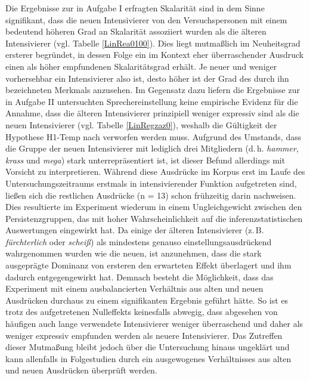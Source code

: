Die Ergebnisse zur in Aufgabe I erfragten Skalarität sind in dem Sinne signifikant, dass die neuen Intensivierer von den Versuchspersonen mit einem bedeutend höheren Grad an Skalarität assoziiert wurden als die älteren Intensivierer (vgl. Tabelle \ref{LinRea0100}). Dies liegt mutmaßlich im Neuheitsgrad ersterer begründet, in dessen Folge ein im Kontext eher überraschender Ausdruck einen als höher empfundenen Skalaritätsgrad erhält. Je neuer und weniger vorhersehbar ein Intensivierer also ist, desto höher ist der Grad des durch ihn bezeichneten Merkmals anzusehen. Im Gegensatz dazu liefern die Ergebnisse zur in {Aufgabe II} untersuchten Sprechereinstellung keine empirische Evidenz für die Annahme, dass die älteren Intensivierer prinzipiell weniger expressiv sind als die neuen Intensivierer (vgl. {Tabelle \ref{LinRegzaz0}}), weshalb die {Gültigkeit} der Hypothese H1-Temp nach {\citet[59]{Tobler.1868}} verworfen werden muss. Aufgrund des Umstands, dass die Gruppe der neuen Intensivierer mit lediglich drei Mitgliedern (d.\,h. \textit{hammer}, \textit{krass} und \textit{mega}) stark {unterrepräsentiert} ist, ist dieser Befund allerdings mit Vorsicht zu interpretieren. Während diese Ausdrücke im Korpus erst im Laufe des Untersuchungszeitraums erstmals in intensivierender Funktion aufgetreten sind, ließen sich die restlichen Ausdrücke {(n = 13)} schon frühzeitig darin nachweisen. Dies resultierte im Experiment wiederum in einem Ungleichgewicht zwischen den Persistenzgruppen, das mit hoher Wahrscheinlichkeit auf die inferenzstatistischen Auswertungen eingewirkt hat. Da einige der älteren Intensivierer (z.\,B. \textit{fürchterlich} oder \textit{scheiß}) als mindestens genauso einstellungsausdrückend wahrgenommen wurden wie die neuen, ist anzunehmen, dass die stark ausgeprägte Dominanz von ersteren den erwarteten Effekt überlagert und ihm dadurch entgegengewirkt hat. Demnach besteht die Möglichkeit, dass das Experiment mit einem ausbalancierten Verhältnis aus alten und neuen Ausdrücken durchaus zu einem signifikanten Ergebnis geführt hätte. So ist es trotz des aufgetretenen Nulleffekts keinesfalls abwegig, dass abgesehen von häufigen auch lange verwendete Intensivierer weniger überraschend und daher als weniger expressiv empfunden werden als neuere Intensivierer. Das Zutreffen dieser Mutmaßung bleibt jedoch über die Untersuchung hinaus ungeklärt und kann allenfalls in Folgestudien durch ein ausgewogenes Verhältnisses aus alten und neuen Ausdrücken {überprüft werden}.




